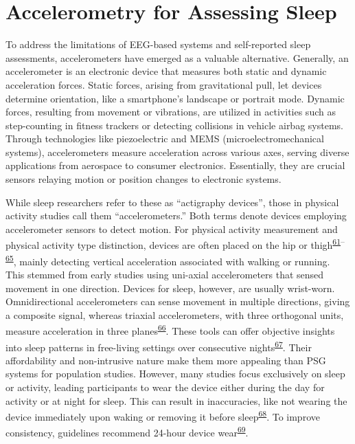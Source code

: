 \documentclass[
  10pt,
]{scrbook}
\begin{document}
\hypertarget{accelerometry-for-assessing-sleep}{%
\section{Accelerometry for Assessing
Sleep}\label{accelerometry-for-assessing-sleep}}

To address the limitations of EEG-based systems and self-reported sleep
assessments, accelerometers have emerged as a valuable alternative.
Generally, an accelerometer is an electronic device that measures both
static and dynamic acceleration forces. Static forces, arising from
gravitational pull, let devices determine orientation, like a
smartphone's landscape or portrait mode. Dynamic forces, resulting from
movement or vibrations, are utilized in activities such as step-counting
in fitness trackers or detecting collisions in vehicle airbag systems.
Through technologies like piezoelectric and MEMS (microelectromechanical
systems), accelerometers measure acceleration across various axes,
serving diverse applications from aerospace to consumer electronics.
Essentially, they are crucial sensors relaying motion or position
changes to electronic systems.

While sleep researchers refer to these as ``actigraphy devices'', those
in physical activity studies call them ``accelerometers.'' Both terms
denote devices employing accelerometer sensors to detect motion. For
physical activity measurement and physical activity type distinction,
devices are often placed on the hip or
thigh\textsuperscript{\protect\hyperlink{ref-migueles_accelerometer_2017}{61}--\protect\hyperlink{ref-arvidsson_re-examination_2019}{65}},
mainly detecting vertical acceleration associated with walking or
running. This stemmed from early studies using uni-axial accelerometers
that sensed movement in one direction. Devices for sleep, however, are
usually wrist-worn. Omnidirectional accelerometers can sense movement in
multiple directions, giving a composite signal, whereas triaxial
accelerometers, with three orthogonal units, measure acceleration in
three planes\textsuperscript{\protect\hyperlink{ref-chen_2005}{66}}.
These tools can offer objective insights into sleep patterns in
free-living settings over consecutive
nights\textsuperscript{\protect\hyperlink{ref-conley_agreement_2019}{67}}.
Their affordability and non-intrusive nature make them more appealing
than PSG systems for population studies. However, many studies focus
exclusively on sleep or activity, leading participants to wear the
device either during the day for activity or at night for sleep. This
can result in inaccuracies, like not wearing the device immediately upon
waking or removing it before
sleep\textsuperscript{\protect\hyperlink{ref-meredith-jones_2016}{68}}.
To improve consistency, guidelines recommend 24-hour device
wear\textsuperscript{\protect\hyperlink{ref-tudor-locke_2012}{69}}.
\end{document}
